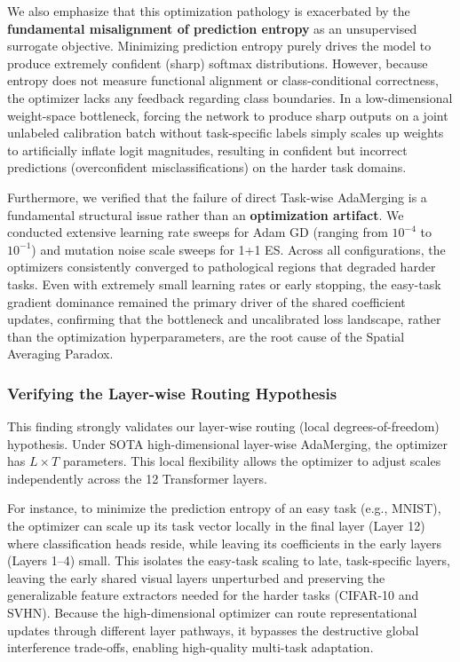 We also emphasize that this optimization pathology is exacerbated by the \textbf{fundamental misalignment of prediction entropy} as an unsupervised surrogate objective. Minimizing prediction entropy purely drives the model to produce extremely confident (sharp) softmax distributions. However, because entropy does not measure functional alignment or class-conditional correctness, the optimizer lacks any feedback regarding class boundaries. In a low-dimensional weight-space bottleneck, forcing the network to produce sharp outputs on a joint unlabeled calibration batch without task-specific labels simply scales up weights to artificially inflate logit magnitudes, resulting in confident but incorrect predictions (overconfident misclassifications) on the harder task domains.

Furthermore, we verified that the failure of direct Task-wise AdaMerging is a fundamental structural issue rather than an \textbf{optimization artifact}. We conducted extensive learning rate sweeps for Adam GD (ranging from $10^{-4}$ to $10^{-1}$) and mutation noise scale sweeps for 1+1 ES. Across all configurations, the optimizers consistently converged to pathological regions that degraded harder tasks. Even with extremely small learning rates or early stopping, the easy-task gradient dominance remained the primary driver of the shared coefficient updates, confirming that the bottleneck and uncalibrated loss landscape, rather than the optimization hyperparameters, are the root cause of the Spatial Averaging Paradox.

\subsubsection{Verifying the Layer-wise Routing Hypothesis}
\label{sub:layer_routing_hypothesis}
This finding strongly validates our layer-wise routing (local degrees-of-freedom) hypothesis. Under SOTA high-dimensional layer-wise AdaMerging, the optimizer has $L \times T$ parameters. This local flexibility allows the optimizer to adjust scales independently across the 12 Transformer layers. 

For instance, to minimize the prediction entropy of an easy task (e.g., MNIST), the optimizer can scale up its task vector locally in the final layer (Layer 12) where classification heads reside, while leaving its coefficients in the early layers (Layers 1--4) small. This isolates the easy-task scaling to late, task-specific layers, leaving the early shared visual layers unperturbed and preserving the generalizable feature extractors needed for the harder tasks (CIFAR-10 and SVHN). Because the high-dimensional optimizer can route representational updates through different layer pathways, it bypasses the destructive global interference trade-offs, enabling high-quality multi-task adaptation.

